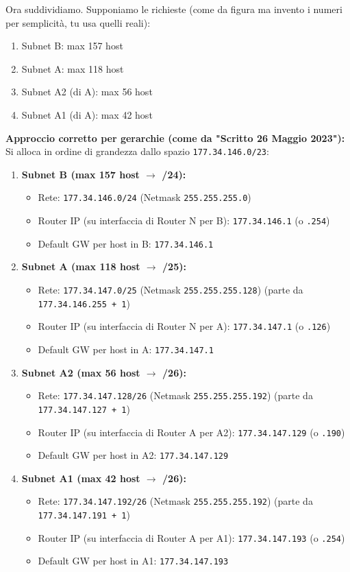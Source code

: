 Ora suddividiamo. Supponiamo le richieste (come da figura ma invento i numeri per semplicità, tu usa quelli reali):
\begin{enumerate}[label=\arabic*.]
    \item Subnet B: max 157 host
    \item Subnet A: max 118 host
    \item Subnet A2 (di A): max 56 host
    \item Subnet A1 (di A): max 42 host
\end{enumerate}

\textbf{Approccio corretto per gerarchie (come da "Scritto 26 Maggio 2023"):}
Si alloca in ordine di grandezza dallo spazio \texttt{177.34.146.0/23}:
\begin{enumerate}[label=\arabic*.]
    \item \textbf{Subnet B (max 157 host $\to$ /24):}
    \begin{itemize}
        \item Rete: \texttt{177.34.146.0/24} (Netmask \texttt{255.255.255.0})
        \item Router IP (su interfaccia di Router N per B): \texttt{177.34.146.1} (o \texttt{.254})
        \item Default GW per host in B: \texttt{177.34.146.1}
    \end{itemize}
    \item \textbf{Subnet A (max 118 host $\to$ /25):}
    \begin{itemize}
        \item Rete: \texttt{177.34.147.0/25} (Netmask \texttt{255.255.255.128}) (parte da \texttt{177.34.146.255 + 1})
        \item Router IP (su interfaccia di Router N per A): \texttt{177.34.147.1} (o \texttt{.126})
        \item Default GW per host in A: \texttt{177.34.147.1}
    \end{itemize}
    \item \textbf{Subnet A2 (max 56 host $\to$ /26):}
    \begin{itemize}
        \item Rete: \texttt{177.34.147.128/26} (Netmask \texttt{255.255.255.192}) (parte da \texttt{177.34.147.127 + 1})
        \item Router IP (su interfaccia di Router A per A2): \texttt{177.34.147.129} (o \texttt{.190})
        \item Default GW per host in A2: \texttt{177.34.147.129}
    \end{itemize}
    \item \textbf{Subnet A1 (max 42 host $\to$ /26):}
    \begin{itemize}
        \item Rete: \texttt{177.34.147.192/26} (Netmask \texttt{255.255.255.192}) (parte da \texttt{177.34.147.191 + 1})
        \item Router IP (su interfaccia di Router A per A1): \texttt{177.34.147.193} (o \texttt{.254})
        \item Default GW per host in A1: \texttt{177.34.147.193}
    \end{itemize}
\end{enumerate}

